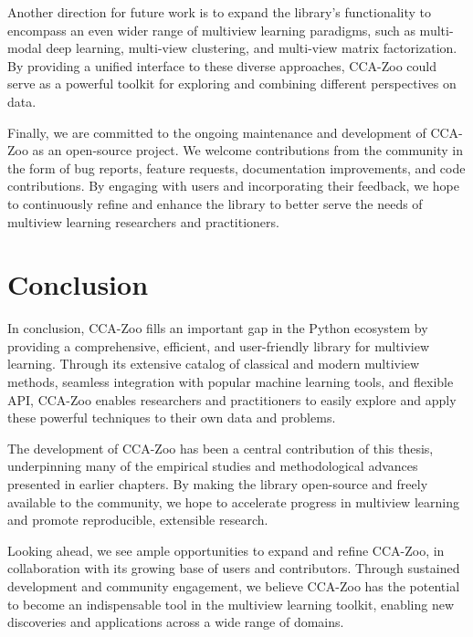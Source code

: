 Another direction for future work is to expand the library's functionality to encompass an even wider range of multiview learning paradigms, such as multi-modal deep learning, multi-view clustering, and multi-view matrix factorization. By providing a unified interface to these diverse approaches, CCA-Zoo could serve as a powerful toolkit for exploring and combining different perspectives on data.

Finally, we are committed to the ongoing maintenance and development of CCA-Zoo as an open-source project. We welcome contributions from the community in the form of bug reports, feature requests, documentation improvements, and code contributions. By engaging with users and incorporating their feedback, we hope to continuously refine and enhance the library to better serve the needs of multiview learning researchers and practitioners.

\section{Conclusion}

In conclusion, CCA-Zoo fills an important gap in the Python ecosystem by providing a comprehensive, efficient, and user-friendly library for multiview learning. Through its extensive catalog of classical and modern multiview methods, seamless integration with popular machine learning tools, and flexible API, CCA-Zoo enables researchers and practitioners to easily explore and apply these powerful techniques to their own data and problems.

The development of CCA-Zoo has been a central contribution of this thesis, underpinning many of the empirical studies and methodological advances presented in earlier chapters. By making the library open-source and freely available to the community, we hope to accelerate progress in multiview learning and promote reproducible, extensible research.

Looking ahead, we see ample opportunities to expand and refine CCA-Zoo, in collaboration with its growing base of users and contributors. Through sustained development and community engagement, we believe CCA-Zoo has the potential to become an indispensable tool in the multiview learning toolkit, enabling new discoveries and applications across a wide range of domains.